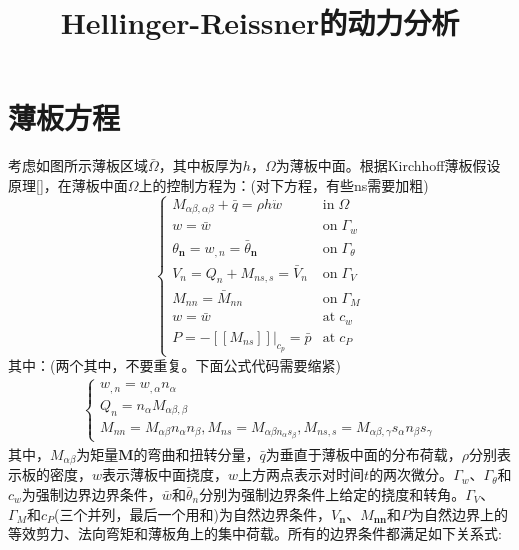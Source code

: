 \documentclass[a4paper]{article}
\begin{document}
\title{Hellinger-Reissner的动力分析}
\maketitle
\section{薄板方程}
考虑如图所示薄板区域$\bar \Omega$，其中板厚为$h$，$\Omega$为薄板中面。根据Kirchhoff薄板假设原理[]，在薄板中面$\Omega$上的控制方程为：(对下方程，有些ns需要加粗)
\begin{equation}
    \begin{cases}
        M_{\alpha\beta,\alpha\beta}+\bar q=\rho h \ddot{w}&\mathrm{in} \; \Omega\\
        w=\bar w&\mathrm{on}\;\Gamma_w\\
        \theta_{\boldsymbol n}=w_{,n}=\bar \theta_{\boldsymbol n}&\mathrm{on}\;\Gamma_{\theta}\\
        V_n=Q_n+M_{ns,s}=\bar V_n&\mathrm{on}\;\Gamma_V\\
        M_{nn}=\bar M_{nn}&\mathrm{on}\; \Gamma_M\\
        w=\bar w&\mathrm{at} \; c_w\\
        P=-[[M_{ns}]]\vert_{c_p}=\bar p&\mathrm{at}\; c_P
    \end{cases}
\end{equation}
其中：(两个其中，不要重复。下面公式代码需要缩紧)
\begin{equation}
\begin{split}
    \begin{cases}
    w_{,n}=w_{,\alpha}n_{\alpha}\\
Q_n=n_{\alpha}M_{\alpha\beta,\beta}\\
M_{nn}=M_{\alpha\beta}n_{\alpha}n_{\beta},M_{ns}=M_{\alpha\beta n_{\alpha}s_{\beta}},M_{ns,s}=M_{\alpha\beta,\gamma}s_{\alpha}n_{\beta}s_{\gamma}
    \end{cases}
\end{split}
\end{equation}
其中，$M_{\alpha\beta}$为矩量$\boldsymbol M$的弯曲和扭转分量，$\bar q$为垂直于薄板中面的分布荷载，$\rho$分别表示板的密度，$w$表示薄板中面挠度，$w$上方两点表示对时间$t$的两次微分。$\Gamma_w$、$\Gamma_{\theta}$和$c_w$为强制边界边界条件，$\bar w$和$\bar \theta_n$分别为强制边界条件上给定的挠度和转角。$\Gamma_V$、$\Gamma_M$和$c_P$(三个并列，最后一个用和)为自然边界条件，$V_{\boldsymbol n}$、$M_{\boldsymbol{nn}}$和$P$为自然边界上的等效剪力、法向弯矩和薄板角上的集中荷载。所有的边界条件都满足如下关系式:
\end{document}
